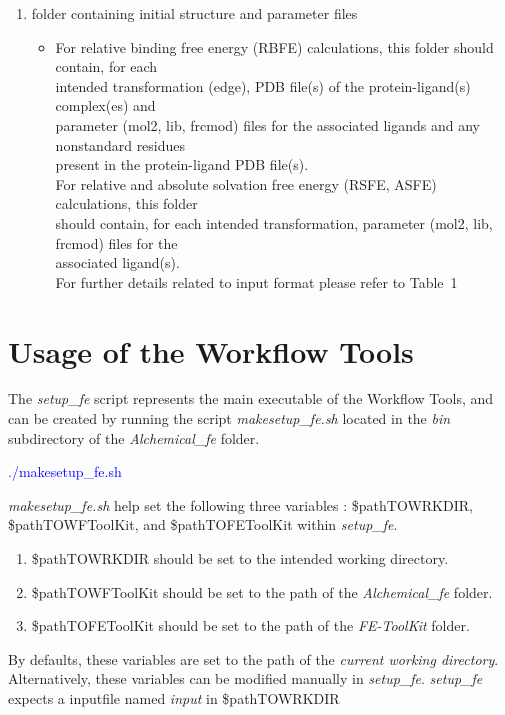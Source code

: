 \documentclass[11pt,letterpaper,titlepage]{article}
\begin{document}
\begin{enumerate}
\begin{itemize}
	\end{itemize}
	\item{folder containing initial structure and parameter files}
		\begin{itemize}
			\item For relative binding free energy (RBFE) calculations, this folder should contain, for each \\
				intended transformation (edge), PDB file(s) of the protein-ligand(s) complex(es) and  \\
				parameter (mol2, lib, frcmod) files for the associated ligands and any nonstandard residues  \\
				present in the protein-ligand PDB file(s).  \\
				For relative and absolute solvation free energy (RSFE, ASFE) calculations, this folder \\
				should contain, for each intended transformation, parameter (mol2, lib, frcmod) files for the  \\
				associated ligand(s). \\
				For further details related to input format please refer to Table~1 \\
		\end{itemize}
\end{enumerate}

\vspace{0.1cm}
\section{Usage of the Workflow Tools}
\vspace{0.1cm}

The \textit{setup\_fe} script represents the main executable of the Workflow Tools, 
and can be 
created by running the script \textit{makesetup\_fe.sh} located in the \textit{bin} subdirectory
of the \textit{Alchemical\_fe} folder. 

\vspace{0.1cm}
\centerline{\textcolor{blue}{./makesetup\_fe.sh}}
\vspace{0.1cm}

\textit{makesetup\_fe.sh} help set the following three variables : \${pathTOWRKDIR}, 
\${pathTOWFToolKit}, and \${pathTOFEToolKit} within \textit{setup\_fe}. 
\begin{enumerate}
	\item{\${pathTOWRKDIR} should be set to the intended working directory.}
	\item{\${pathTOWFToolKit} should be set to the path of the \textit{Alchemical\_fe} folder.}
	\item{\${pathTOFEToolKit} should be set to the path of the \textit{FE-ToolKit} folder.}
\end{enumerate}
By defaults, these variables are set to the path of the \textit{current working directory}. Alternatively, these variables 
can be modified manually in \textit{setup\_fe}. 
\textit{setup\_fe} expects a inputfile named \textit{input} in \${pathTOWRKDIR}
\end{document}
